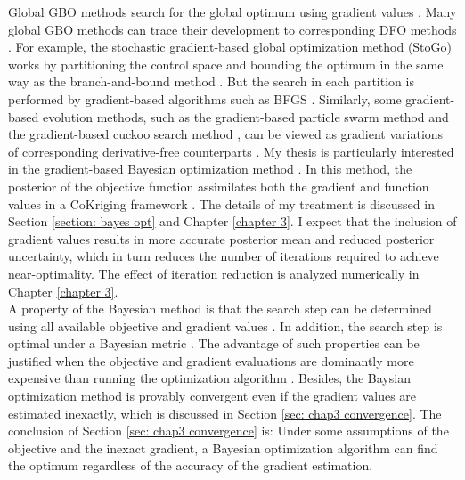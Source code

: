Global GBO methods search for the global optimum using gradient values \cite{opt via sim review, nonlinear program}.
Many global GBO methods can trace their development to corresponding DFO methods \cite{stogo 1, stogo 2, grad particle swarm, grad cuckoo, grad coKriging}. 
For example, the stochastic gradient-based global optimization method (StoGo) 
\cite{stogo 1, stogo 2} works by partitioning the control space and bounding the optimum in the same way 
as the branch-and-bound method \cite{Branch and Bound}. But the search in each partition is performed
by gradient-based algorithms such as BFGS \cite{quasiNewton}. Similarly, some gradient-based evolution methods,
such as the gradient-based particle swarm method \cite{grad particle swarm} 
and the gradient-based cuckoo search method \cite{grad cuckoo},
can be viewed as gradient variations of corresponding derivative-free counterparts \cite{particle swarm, cuckoo}.
My thesis is particularly interested in the gradient-based Bayesian optimization method \cite{coKriging}.
In this method, the posterior of the objective function assimilates both the gradient 
and function values in a CoKriging framework \cite{derivative RKHS, coKriging}.
The details of my treatment is discussed in Section \ref{section: bayes opt} and
Chapter \ref{chapter 3}.
I expect that the inclusion of gradient values results in more accurate posterior mean and 
reduced posterior uncertainty, which in turn reduces the number of iterations required to
achieve near-optimality. The effect of iteration reduction 
is analyzed numerically in Chapter \ref{chapter 3}.\\

A property of the Bayesian method is that the search step can be determined using all 
available objective and gradient values \cite{practical Bayesian, jones1998}. In addition, the search step is optimal 
under a Bayesian metric \cite{practical Bayesian, jones1998}. The advantage of such properties can be justified
when the objective and gradient evaluations
are dominantly more expensive than running the optimization algorithm \cite{practical Bayesian}. Besides, the
Baysian optimization method is provably convergent even if the gradient values are estimated
inexactly, which is discussed in Section \ref{sec: chap3 convergence}.
The conclusion of Section \ref{sec: chap3 convergence} is: Under some assumptions of the objective and the inexact gradient, 
a Bayesian optimization algorithm can find the optimum regardless of the accuracy of the gradient estimation.\\

